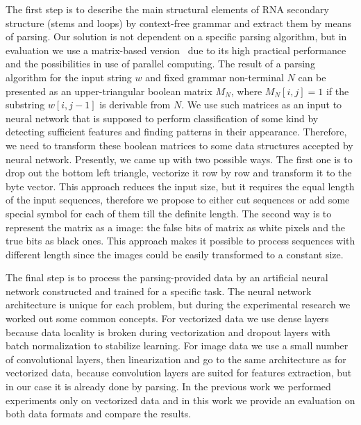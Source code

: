 \documentclass[12pt,a4paper]{cibb}
\begin{document}
The first step is to describe the main structural elements of RNA secondary structure (stems and loops) by context-free grammar and extract them by means of parsing. Our solution is not dependent on a specific parsing algorithm, but in evaluation we use a matrix-based version~\cite{Azimov:2018:CPQ:3210259.3210264} due to its high practical performance and the possibilities in use of parallel computing. The result of a parsing algorithm for the input string $w$ and fixed grammar non-terminal $N$ can be presented as an upper-triangular boolean matrix $M_N$, where $M_N [i,j] = 1$ if the substring $w[i,j-1]$ is derivable from $N$. We use such matrices as an input to neural network that is supposed to perform classification of some kind by detecting sufficient features and finding patterns in their appearance. Therefore, we need to transform these boolean matrices to some data structures accepted by neural network. Presently, we came up with two possible ways. The first one is to drop out the bottom left triangle, vectorize it row by row and transform it to the byte vector. This approach reduces the input size, but it requires the equal length of the input sequences, therefore we propose to either cut sequences or add some special symbol for each of them till the definite length. The second way is to represent the matrix as a image: the false bits of matrix as white pixels and the true bits as black ones. This approach makes it possible to process sequences with different length since the images could be easily transformed to a constant size. 

The final step is to process the parsing-provided data by an artificial neural network constructed and trained for a specific task. The neural network architecture is unique for each problem, but during the experimental research we worked out some common concepts. For vectorized data we use dense layers because data locality is broken during vectorization and dropout layers with batch normalization to stabilize learning. For image data we use a small number of convolutional layers, then linearization and go to the same architecture as for vectorized data, because convolution layers are suited for features extraction, but in our case it is already done by parsing. In the previous work we performed experiments only on vectorized data and in this work we provide an evaluation on both data formats and compare the results.
\end{document}
